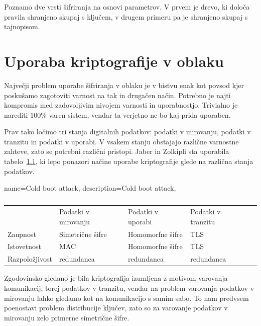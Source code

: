 \documentclass[12pt,a4paper,openany]{book}
\begin{document}
Poznamo dve vrsti šifriranja na osnovi parametrov. V prvem je drevo, ki določa pravila shranjeno skupaj s ključem, v drugem primeru pa je shranjeno skupaj s tajnopisom.

\chapter{Uporaba kriptografije v oblaku}

Največji problem uporabe šifriranja v oblaku je v bistvu enak kot povsod kjer poskušamo zagotoviti varnost na tak in drugačen način. Potrebno je najti kompromis med zadovoljivim nivojem varnosti in uporabnostjo. Trivialno je narediti 100\% varen sistem, vendar ta verjetno ne bo kaj prida uporaben.

Prav tako ločimo tri stanja digitalnih podatkov: podatki v mirovanju, podatki v tranzitu in podatki v uporabi. V vsakem stanju obstajajo različne varnostne zahteve, zato se potrebni različni pristopi. Jaber in Zolkipli\cite{jaber2013use} sta uporabila tabelo~\ref{tbl:cloudtriad}, ki lepo ponazori načine uporabe kriptografije glede na različna stanja podatkov.

{
  name=Cold boot attack,
  description={Cold boot attack},
}

\begin{table}[]
  \centering
  \begin{tabular}{lllll}
                                        & Podatki v mirovanju                   & Podatki v uporabi                    & Podatki v tranzitu              &  \\ \cline{2-4}
    \multicolumn{1}{l|}{Zaupnost}       & \multicolumn{1}{l|}{Simetrične šifre} & \multicolumn{1}{l|}{Homomorfne šifre} & \multicolumn{1}{l|}{TLS}        &  \\ \cline{2-4}
    \multicolumn{1}{l|}{Istovetnost}    & \multicolumn{1}{l|}{MAC}              & \multicolumn{1}{l|}{Homomorfne šifre} & \multicolumn{1}{l|}{TLS}        &  \\ \cline{2-4}
    \multicolumn{1}{l|}{Razpoložjivost} & \multicolumn{1}{l|}{redundanca}       & \multicolumn{1}{l|}{redundanca}       & \multicolumn{1}{l|}{redundanca} &  \\ \cline{2-4}
  \end{tabular}
  \caption{}
\label{tbl:cloudtriad}
\end{table}

Zgodovinsko gledano je bila kriptografija izumljena z motivom varovanja komunikacij, torej podatkov v tranzitu, vendar na problem varovanja podatkov v mirovanju lahko gledamo kot na komunikacijo s samim sabo. To nam predvsem poenostavi problem distribucije ključev, zato so za varovanje podatkov v mirovanju zelo primerne simetrične šifre.
\end{document}
